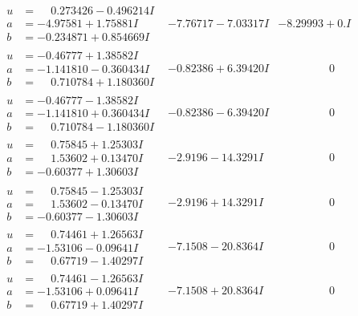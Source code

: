\documentclass[1p]{elsarticle_modified}
\theoremstyle{definition}
\begin{document}
$$\begin{array}{c|c|c}
\begin{aligned}
u &= \phantom{-}0.273426 - 0.496214 I \\
a &= -4.97581 + 1.75881 I \\
b &= -0.234871 + 0.854669 I\end{aligned}
 & -7.76717 - 7.03317 I & -8.29993 + 0. I\phantom{ +0.000000I} \\ \hline\begin{aligned}
u &= -0.46777 + 1.38582 I \\
a &= -1.141810 - 0.360434 I \\
b &= \phantom{-}0.710784 + 1.180360 I\end{aligned}
 & -0.82386 + 6.39420 I & \phantom{-0.000000 } 0 \\ \hline\begin{aligned}
u &= -0.46777 - 1.38582 I \\
a &= -1.141810 + 0.360434 I \\
b &= \phantom{-}0.710784 - 1.180360 I\end{aligned}
 & -0.82386 - 6.39420 I & \phantom{-0.000000 } 0 \\ \hline\begin{aligned}
u &= \phantom{-}0.75845 + 1.25303 I \\
a &= \phantom{-}1.53602 + 0.13470 I \\
b &= -0.60377 + 1.30603 I\end{aligned}
 & -2.9196 - 14.3291 I & \phantom{-0.000000 } 0 \\ \hline\begin{aligned}
u &= \phantom{-}0.75845 - 1.25303 I \\
a &= \phantom{-}1.53602 - 0.13470 I \\
b &= -0.60377 - 1.30603 I\end{aligned}
 & -2.9196 + 14.3291 I & \phantom{-0.000000 } 0 \\ \hline\begin{aligned}
u &= \phantom{-}0.74461 + 1.26563 I \\
a &= -1.53106 - 0.09641 I \\
b &= \phantom{-}0.67719 - 1.40297 I\end{aligned}
 & -7.1508 - 20.8364 I & \phantom{-0.000000 } 0 \\ \hline\begin{aligned}
u &= \phantom{-}0.74461 - 1.26563 I \\
a &= -1.53106 + 0.09641 I \\
b &= \phantom{-}0.67719 + 1.40297 I\end{aligned}
 & -7.1508 + 20.8364 I & \phantom{-0.000000 } 0\\

\end{array}$$
\end{document}
